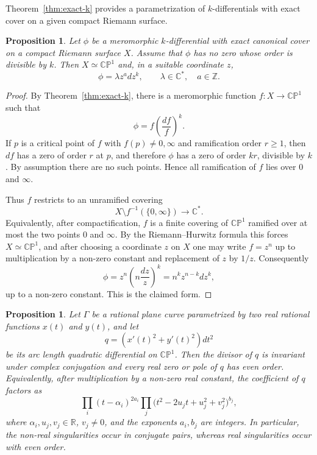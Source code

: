 \documentclass[reqno]{amsart}
\newtheorem{proposition}[theorem]{Proposition}
\theoremstyle{definition}
\theoremstyle{remark}
\theoremstyle{definition}
\theoremstyle{definition}
\theoremstyle{definition}
\begin{document}
Theorem~\ref{thm:exact-k} provides a parametrization of $k$-differentials with exact cover on a given compact Riemann surface.

\begin{proposition}\label{prop:exact-k-no-divisible-zeros}
Let $\phi$ be a meromorphic $k$-differential with exact canonical cover on a compact Riemann surface $X$. Assume that $\phi$ has no zero whose order is divisible by $k$. Then $X\simeq \mathbb{CP}^{1}$ and, in a suitable coordinate $z$,
\[
 \phi=\lambda z^{a}dz^{k},\qquad \lambda\in\mathbb C^*,\quad a\in\mathbb Z .
\]
\end{proposition}

\begin{proof}
By Theorem~\ref{thm:exact-k}, there is a meromorphic function $f:X\to\mathbb{CP}^{1}$ such that
\[
 \phi=f\left(\frac{df}{f}\right)^k .
\]
If $p$ is a critical point of $f$ with $f(p)\neq0,\infty$ and ramification order $r\geq1$, then $df$ has a zero of order $r$ at $p$, and therefore $\phi$ has a zero of order $kr$, divisible by $k$. By assumption there are no such points. Hence all ramification of $f$ lies over $0$ and $\infty$.

Thus $f$ restricts to an unramified covering
\[
 X\setminus f^{-1}(\{0,\infty\})\longrightarrow \mathbb{C}^{*}.
\]
Equivalently, after compactification, $f$ is a finite covering of $\mathbb{CP}^{1}$ ramified over at most the two points $0$ and $\infty$. By the Riemann--Hurwitz formula this forces $X\simeq\mathbb{CP}^{1}$, and after choosing a coordinate $z$ on $X$ one may write $f=z^n$ up to multiplication by a non-zero constant and replacement of $z$ by $1/z$. Consequently
\[
 \phi=z^n\left(n\frac{dz}{z}\right)^k
     = n^k z^{n-k}dz^k,
\]
up to a non-zero constant. This is the claimed form.
\end{proof}

\begin{proposition}\label{prop:rational-real-divisor}
Let $\Gamma$ be a rational plane curve parametrized by two real rational
functions $x(t)$ and $y(t)$, and let
\[
 q=(x'(t)^2+y'(t)^2)dt^2
\]
be its arc length quadratic differential on $\mathbb{CP}^1$. Then the
divisor of $q$ is invariant under complex conjugation and every real
zero or pole of $q$ has even order. Equivalently, after multiplication
by a non-zero real constant, the coefficient of $q$ factors as
\[
 \prod_i (t-\alpha_i)^{2a_i}
 \prod_j \bigl(t^2-2u_jt+u_j^2+v_j^2\bigr)^{b_j},
\]
where $\alpha_i,u_j,v_j\in\mathbb R$, $v_j\ne0$, and the exponents
$a_i,b_j$ are integers. In particular, the non-real singularities occur
in conjugate pairs, whereas real singularities occur with even order.
\end{proposition}
\end{document}
